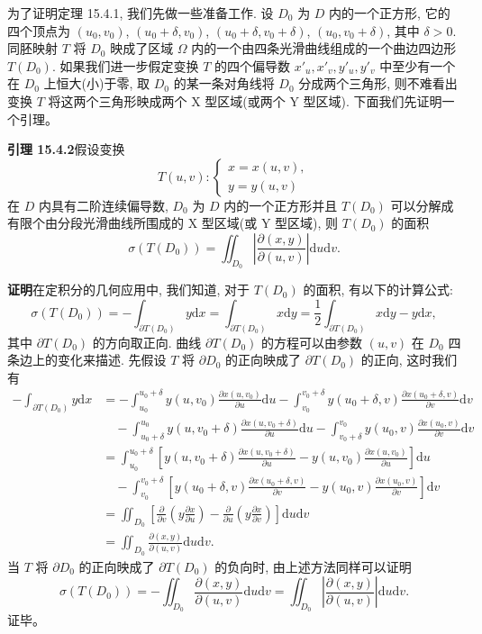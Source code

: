 \documentclass[UTF8, 12pt, fontset=fandol, oneside]{ctexart}
\begin{document}
为了证明定理 15.4.1, 我们先做一些准备工作. 设 $D_0$ 为 $D$ 内的一个正方形, 它的四个顶点为 $(u_0,v_0)$, $(u_0+\delta,v_0)$, $(u_0+\delta,v_0+\delta)$, $(u_0,v_0+\delta)$, 其中 $\delta>0$. 同胚映射 $T$ 将 $D_0$ 映成了区域 $\Omega$ 内的一个由四条光滑曲线组成的一个曲边四边形 $T(D_0)$. 如果我们进一步假定变换 $T$ 的四个偏导数 $x'_u,x'_v,y'_u,y'_v$ 中至少有一个在 $D_0$ 上恒大(小)于零, 取 $D_0$ 的某一条对角线将 $D_0$ 分成两个三角形, 则不难看出变换 $T$ 将这两个三角形映成两个 X 型区域(或两个 Y 型区域). 下面我们先证明一个引理。

\noindent\textbf{引理 15.4.2}\quad 假设变换
\[
  T(u,v):
  \begin{cases}
    x=x(u,v),\\
    y=y(u,v)
  \end{cases}
\]
在 $D$ 内具有二阶连续偏导数, $D_0$ 为 $D$ 内的一个正方形并且 $T(D_0)$ 可以分解成有限个由分段光滑曲线所围成的 X 型区域(或 Y 型区域), 则 $T(D_0)$ 的面积
\[
  \sigma(T(D_0))=\iint_{D_0}\left|\frac{\partial(x,y)}{\partial(u,v)}\right|\mathrm du\mathrm dv.
\]

\noindent\textbf{证明}\quad 在定积分的几何应用中, 我们知道, 对于 $T(D_0)$ 的面积, 有以下的计算公式:
\[
  \sigma(T(D_0))=-\int_{\partial T(D_0)}y\mathrm dx
  =\int_{\partial T(D_0)}x\mathrm dy
  =\frac12\int_{\partial T(D_0)}x\mathrm dy-y\mathrm dx,
\]
其中 $\partial T(D_0)$ 的方向取正向. 曲线 $\partial T(D_0)$ 的方程可以由参数 $(u,v)$ 在 $D_0$ 四条边上的变化来描述. 先假设 $T$ 将 $\partial D_0$ 的正向映成了 $\partial T(D_0)$ 的正向, 这时我们有
\[
\begin{aligned}
  -\int_{\partial T(D_0)}y\mathrm dx
  &=-\int_{u_0}^{u_0+\delta}y(u,v_0)\frac{\partial x(u,v_0)}{\partial u}\mathrm du
    -\int_{v_0}^{v_0+\delta}y(u_0+\delta,v)\frac{\partial x(u_0+\delta,v)}{\partial v}\mathrm dv\\
  &\quad-\int_{u_0+\delta}^{u_0}y(u,v_0+\delta)\frac{\partial x(u,v_0+\delta)}{\partial u}\mathrm du
    -\int_{v_0+\delta}^{v_0}y(u_0,v)\frac{\partial x(u_0,v)}{\partial v}\mathrm dv\\
  &=\int_{u_0}^{u_0+\delta}
    \left[y(u,v_0+\delta)\frac{\partial x(u,v_0+\delta)}{\partial u}
    -y(u,v_0)\frac{\partial x(u,v_0)}{\partial u}\right]\mathrm du\\
  &\quad-\int_{v_0}^{v_0+\delta}
    \left[y(u_0+\delta,v)\frac{\partial x(u_0+\delta,v)}{\partial v}
    -y(u_0,v)\frac{\partial x(u_0,v)}{\partial v}\right]\mathrm dv\\
  &=\iint_{D_0}\left[
    \frac{\partial}{\partial v}\left(y\frac{\partial x}{\partial u}\right)
    -\frac{\partial}{\partial u}\left(y\frac{\partial x}{\partial v}\right)
    \right]\mathrm du\mathrm dv\\
  &=\iint_{D_0}\frac{\partial(x,y)}{\partial(u,v)}\mathrm du\mathrm dv.
\end{aligned}
\]
当 $T$ 将 $\partial D_0$ 的正向映成了 $\partial T(D_0)$ 的负向时, 由上述方法同样可以证明
\[
  \sigma(T(D_0))=-\iint_{D_0}\frac{\partial(x,y)}{\partial(u,v)}\mathrm du\mathrm dv
  =\iint_{D_0}\left|\frac{\partial(x,y)}{\partial(u,v)}\right|\mathrm du\mathrm dv.
\]
证毕。
\end{document}
